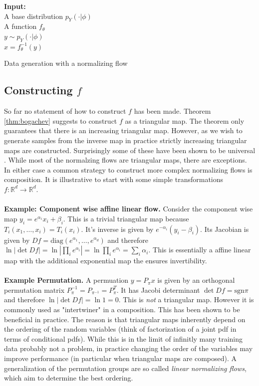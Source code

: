 \documentclass[12pt,a4paper]{article}
\begin{document}
\begin{algorithm}[t] \label{algo:normalizing_flow_generation}
	\SetAlgoLined
	\textbf{Input:} \\ 
	\quad A base distribution $p_Y(\cdot|\phi)$ \\
	\quad A function $f_\theta$ \\
	{
	$y \sim p_Y(\cdot|\phi)$  \\
	$x = f^{-1}_\theta(y)$
}
	\caption{Data generation with a normalizing flow}
\end{algorithm} 
\subsection{Constructing $f$}
So far no statement of how to construct $f$ has been made. Theorem \ref{thm:bogachev} suggests to construct $f$ as a triangular map. The theorem only guarantees that there is an increasing triangular map. However, as we wish to generate samples from the inverse map in practice strictly increasing triangular maps are constructed. Surprisingly some of these have been shown to be universal \cite{jaini_polynomial_flow_2019, huang_2018_neural_autoregressive_flows}. While most of the normalzing flows are triangular maps, there are exceptions. In either case a common strategy to construct more complex normalizing flows is composition. It is illustrative to start with some simple transformations $f: \mathbb{R}^d \rightarrow \mathbb{R}^d$.
\\
\\
\textbf{Example: Component wise affine linear flow.} Consider the component wise map $y_i = e^{\alpha_i} x_i + \beta_i$. This is a trivial triangular map because $T_i(x_1, \dots, x_i) = T_i(x_i)$. It's inverse is given by $e^{-\alpha_i} (y_i - \beta_i)$. Its Jacobian is given by $Df = \text{diag}(e^{\alpha_1}, \dots, e^{\alpha_d})$ and therefore $\ln |\det Df| = \ln |\prod_i e^{\alpha_i}| = \ln \prod_i e^{\alpha_i} = \sum_i \alpha_i$. This is essentially a affine linear map with the additional exponential map the ensures invertibility. \\ \\
\textbf{Example Permutation.}
A permuation $y = P_\pi x$ is given by an orthogonal permutation matrix $P^{-1}_\pi =P_{\pi^{-1}} = P^{T}_\pi$. It has Jacobi determinant $\det Df = \text{sgn}{\pi}$ and therefore $\ln |\det Df| = \ln 1 = 0$. This is \textit{not} a triangular map. 
However it is commonly used as "intertwiner" in a composition. This has been shown to be beneficial in practice. The reason is that triangular maps inherently depend on the ordering of the random variables (think of factorization of a joint pdf in terms of conditional pdfs). While this is in the limit of infinitly many training data probably not a problem, in practice changing the order of the variables may improve performance (in particular when triangular maps are composed). A generalization of the permutation groups are so called \textit{linear normalizing flows}, which aim to determine the best ordering.
\end{document}
